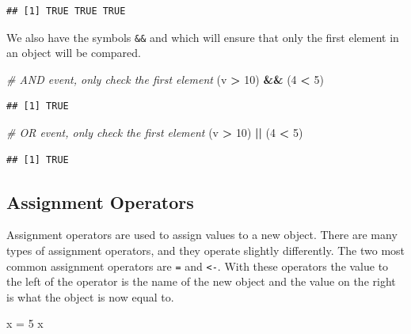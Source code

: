 \documentclass[
]{book}
\newenvironment{Shaded}{\begin{snugshade}}{\end{snugshade}}
\newcommand{\CommentTok}[1]{\textcolor[rgb]{0.56,0.35,0.01}{\textit{#1}}}
\newcommand{\DecValTok}[1]{\textcolor[rgb]{0.00,0.00,0.81}{#1}}
\newcommand{\NormalTok}[1]{#1}
\newcommand{\OperatorTok}[1]{\textcolor[rgb]{0.81,0.36,0.00}{\textbf{#1}}}
\newcommand{\StringTok}[1]{\textcolor[rgb]{0.31,0.60,0.02}{#1}}
\begin{document}
\begin{verbatim}
## [1] TRUE TRUE TRUE
\end{verbatim}

We also have the symbols \texttt{\&\&} and \texttt{\textbar{}\textbar{}} which will ensure that only the first element in an object will be compared.

\begin{Shaded}
\begin{Highlighting}[]
\CommentTok{# AND event, only check the first element}
\NormalTok{(v }\OperatorTok{>}\StringTok{ }\DecValTok{10}\NormalTok{) }\OperatorTok{&&}\StringTok{ }\NormalTok{(}\DecValTok{4} \OperatorTok{<}\StringTok{ }\DecValTok{5}\NormalTok{) }
\end{Highlighting}
\end{Shaded}

\begin{verbatim}
## [1] TRUE
\end{verbatim}

\begin{Shaded}
\begin{Highlighting}[]
\CommentTok{# OR event, only check the first element}
\NormalTok{(v }\OperatorTok{>}\StringTok{ }\DecValTok{10}\NormalTok{) }\OperatorTok{||}\StringTok{ }\NormalTok{(}\DecValTok{4} \OperatorTok{<}\StringTok{ }\DecValTok{5}\NormalTok{) }
\end{Highlighting}
\end{Shaded}

\begin{verbatim}
## [1] TRUE
\end{verbatim}

\hypertarget{assignment-operators}{%
\subsection*{Assignment Operators}\label{assignment-operators}}

Assignment operators are used to assign values to a new object. There are many types of assignment operators, and they operate slightly differently. The two most common assignment operators are \texttt{=} and \texttt{\textless{}-}. With these operators the value to the left of the operator is the name of the new object and the value on the right is what the object is now equal to.

\begin{Shaded}
\begin{Highlighting}[]
\NormalTok{x =}\StringTok{ }\DecValTok{5}
\NormalTok{x}
\end{Highlighting}
\end{Shaded}
\end{document}
